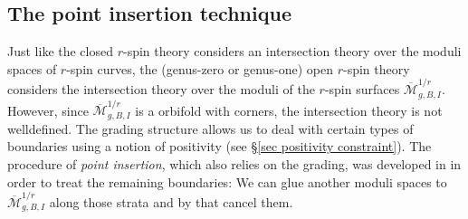 \documentclass[11pt]{amsart}
\theoremstyle{definition}
\theoremstyle{remark}
\newcommand{\<}{\left<}
\renewcommand{\>}{\right>}
\numberwithin{equation}{section}
\def\Mbar{{\overline{\mathcal M}}}
\begin{document}
\subsection{The point insertion technique}\label{subsec PI}
Just like the closed $r$-spin theory considers an intersection theory over the moduli spaces of $r$-spin curves,  the (genus-zero or genus-one) open $r$-spin theory considers the intersection theory over the moduli of the $r$-spin surfaces $\Mbar^{1/r}_{g,B,I}$. However, since $\Mbar^{1/r}_{g,B,I}$ is a orbifold with corners, the intersection theory is %
not welldefined. The %
grading structure allows us to deal with %
certain types of %
boundaries using a notion of positivity (see \S \ref{sec positivity constraint}). The procedure of \textit{point insertion}, which also relies on the grading, was developed in \cite{TZ1} in order to treat the remaining %
boundaries: We can %
glue another moduli spaces  to $\Mbar^{1/r}_{g,B,I}$ along those strata and by that cancel %
them. 
\end{document}
